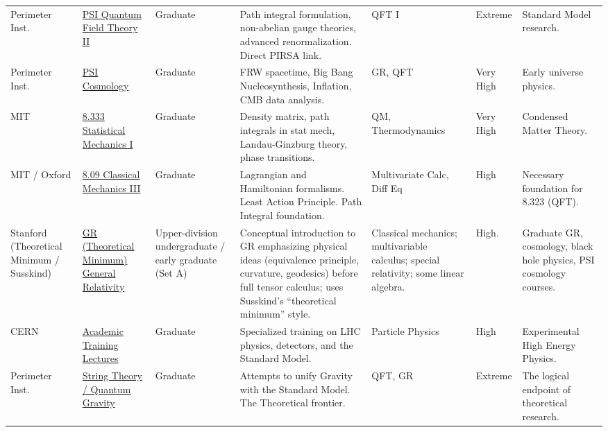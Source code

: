 \documentclass[10pt, a4paper, landscape]{article}
\begin{document}
\begin{longtable}{L{2cm} L{3.5cm} L{1.8cm} L{6cm} L{3.5cm} L{2cm} L{5cm}}
    \addlinespace
    Perimeter Inst. & \href{https://pirsa.org/C16012}{PSI Quantum Field Theory II} & Graduate & Path integral formulation, non-abelian gauge theories, advanced renormalization. Direct PIRSA link. & QFT I & Extreme & Standard Model research. \\
    \addlinespace
    Perimeter Inst. & \href{https://pirsa.org/C15011}{PSI Cosmology} & Graduate & FRW spacetime, Big Bang Nucleosynthesis, Inflation, CMB data analysis. & GR, QFT & Very High & Early universe physics. \\
    \addlinespace
    MIT & \href{https://ocw.mit.edu/courses/8-333-statistical-mechanics-i-statistical-mechanics-of-particles-fall-2013/}{8.333 Statistical Mechanics I} & Graduate & Density matrix, path integrals in stat mech, Landau-Ginzburg theory, phase transitions. & QM, Thermodynamics & Very High & Condensed Matter Theory. \\
    \addlinespace
    MIT / Oxford & \href{https://ocw.mit.edu/courses/8-09-classical-mechanics-iii-fall-2014/}{8.09 Classical Mechanics III} & Graduate & Lagrangian and Hamiltonian formalisms. Least Action Principle. Path Integral foundation. & Multivariate Calc, Diff Eq & High & Necessary foundation for 8.323 (QFT). \\
    \addlinespace
    Stanford (Theoretical Minimum / Susskind) & \href{https://theoreticalminimum.com/courses/general-relativity/2012/fall}{GR (Theoretical Minimum) General Relativity} & Upper-division undergraduate / early graduate (Set A) & Conceptual introduction to GR emphasizing physical ideas (equivalence principle, curvature, geodesics) before full tensor calculus; uses Susskind’s “theoretical minimum” style. & Classical mechanics; multivariable calculus; special relativity; some linear algebra. & High. & Graduate GR, cosmology, black hole physics, PSI cosmology courses. \\
    \addlinespace
    CERN & \href{https://academic-training.web.cern.ch/archive}{Academic Training Lectures} & Graduate & Specialized training on LHC physics, detectors, and the Standard Model. & Particle Physics & High & Experimental High Energy Physics. \\
    \addlinespace
    Perimeter Inst. & \href{https://pirsa.org/C14013}{String Theory / Quantum Gravity} & Graduate & Attempts to unify Gravity with the Standard Model. The Theoretical frontier. & QFT, GR & Extreme & The logical endpoint of theoretical research. \\


\end{longtable}
\end{document}
